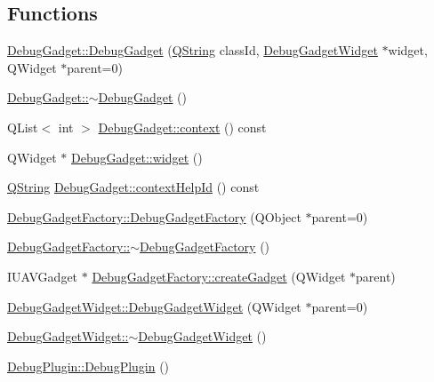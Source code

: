 \subsection*{\-Functions}
\begin{DoxyCompactItemize}
\item 
\hyperlink{group___debug_gadget_plugin_gae32cda168c382c01595bc348472e69f0}{\-Debug\-Gadget\-::\-Debug\-Gadget} (\hyperlink{group___u_a_v_objects_plugin_gab9d252f49c333c94a72f97ce3105a32d}{\-Q\-String} class\-Id, \hyperlink{class_debug_gadget_widget}{\-Debug\-Gadget\-Widget} $\ast$widget, \-Q\-Widget $\ast$parent=0)
\item 
\hyperlink{group___debug_gadget_plugin_gab1dfec6b8b4cb29fa466e6102d3096ac}{\-Debug\-Gadget\-::$\sim$\-Debug\-Gadget} ()
\item 
\-Q\-List$<$ int $>$ \hyperlink{group___debug_gadget_plugin_gaaf1624068acedd32979ab08deddefe6e}{\-Debug\-Gadget\-::context} () const 
\item 
\-Q\-Widget $\ast$ \hyperlink{group___debug_gadget_plugin_ga08f35a753d418ed6e9d9594bcce8fee8}{\-Debug\-Gadget\-::widget} ()
\item 
\hyperlink{group___u_a_v_objects_plugin_gab9d252f49c333c94a72f97ce3105a32d}{\-Q\-String} \hyperlink{group___debug_gadget_plugin_ga123c9f10792e9dcd8f128da2be20f176}{\-Debug\-Gadget\-::context\-Help\-Id} () const 
\item 
\hyperlink{group___debug_gadget_plugin_ga48259f8b08f0767ab22c4b022643e134}{\-Debug\-Gadget\-Factory\-::\-Debug\-Gadget\-Factory} (\-Q\-Object $\ast$parent=0)
\item 
\hyperlink{group___debug_gadget_plugin_gadb2d9eecc3b92fc56cf849ffd7230e91}{\-Debug\-Gadget\-Factory\-::$\sim$\-Debug\-Gadget\-Factory} ()
\item 
\-I\-U\-A\-V\-Gadget $\ast$ \hyperlink{group___debug_gadget_plugin_ga24e00530d01c4d1874ac8395caa2370c}{\-Debug\-Gadget\-Factory\-::create\-Gadget} (\-Q\-Widget $\ast$parent)
\item 
\hyperlink{group___debug_gadget_plugin_ga67e29acbc33b5ca194215ea1c70e9e72}{\-Debug\-Gadget\-Widget\-::\-Debug\-Gadget\-Widget} (\-Q\-Widget $\ast$parent=0)
\item 
\hyperlink{group___debug_gadget_plugin_ga74a70926720377a2a71c0946408b8127}{\-Debug\-Gadget\-Widget\-::$\sim$\-Debug\-Gadget\-Widget} ()
\item 
\hyperlink{group___debug_gadget_plugin_ga20c99d3ead7ff85b7fedc4e18a1e9a8b}{\-Debug\-Plugin\-::\-Debug\-Plugin} ()
\item 

\end{DoxyCompactItemize}
